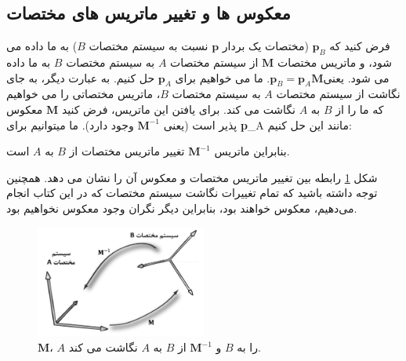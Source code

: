 \subsection{\textbf{معکوس ها و تغییر ماتریس های مختصات}}
{
    \Large
    \begin{spacing}{1.5}
        فرض کنید که $\textbf{p}_{B}$ (مختصات یک بردار $\textbf{p}$ نسبت به سیستم مختصات $B$) به ما داده می شود، و ماتریس مختصات $\textbf{M}$ از سیستم مختصات $A$ به سیستم مختصات $B$ به ما داده می شود.
        یعنی$\textbf{p}_{B}=\textbf{p}_{A}\textbf{M}$. ما می خواهیم برای $\textbf{p}_{A}$ حل کنیم.
        به عبارت دیگر، به جای نگاشت از سیستم مختصات $A$ به سیستم مختصات $B$، ماتریس مختصاتی را می خواهیم که ما را از $B$ به $A$ نگاشت می کند.
        برای یافتن این ماتریس، فرض کنید $\textbf{M}$ معکوس پذیر است (یعنی $\textbf{M}^{-1}$ وجود دارد). ما میتوانیم برای \textbf{p}_{A} مانند این حل کنیم:

        \begin{flushleft}
        \end{flushleft}

        بنابراین ماتریس $\textbf{M}^{-1}$ تغییر ماتریس مختصات از $B$ به $A$ است.

        شکل \ref{fig:4.Session.1.3.13} رابطه بین تغییر ماتریس مختصات و معکوس آن را نشان می دهد.
        همچنین توجه داشته باشید که تمام تغییرات نگاشت سیستم مختصات که در این کتاب انجام می‌دهیم، معکوس خواهند بود، بنابراین دیگر نگران وجود معکوس نخواهیم بود.

        \begin{figure}[H]
            \centering
            \setlength{\belowcaptionskip}{-10pt}
            \includegraphics[width=0.5\textwidth]{Images/4/3/4.Session.1.3.13}
            \caption {$\textbf{M}$، $A$ را به $B$ و $\textbf{M}^{-1}$ از $B$ به $A$ نگاشت می کند.}
            \label{fig:4.Session.1.3.13}
        \end{figure}


\end{spacing}}
